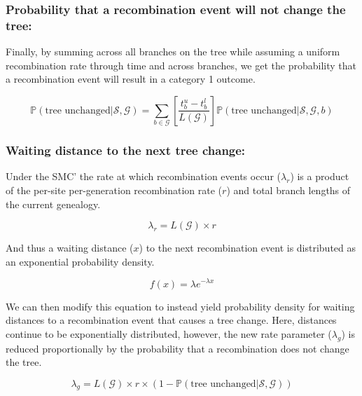 \documentclass[11pt]{article}
\begin{document}
\subsubsection{Probability that a recombination event will not change the tree:}
Finally, by summing across all branches on the tree while assuming a uniform 
recombination rate through time and across branches, we get the
probability that a recombination event will result in a category 1 outcome.

\begin{equation}
	\mathbb{P}(\textrm{tree unchanged} | \mathcal{S},\mathcal{G}) = 
	\sum_{b \in \mathcal{G}}
	\left[\frac{t^u_b - t^l_b}{L(\mathcal{G})}\right]
	\mathbb{P}(\textrm{tree unchanged} | \mathcal{S},\mathcal{G},b)
\end{equation}

\subsubsection{Waiting distance to the next tree change:}
Under the SMC' the rate at which recombination events occur ($\lambda_r$)
is a product of the per-site per-generation recombination rate ($r$) and 
total branch lengths of the current genealogy.

\begin{equation}
	\lambda_{r} = L(\mathcal{G}) \times r
\end{equation}

\noindent And thus a waiting distance ($x$) to the next recombination event 
is distributed as an exponential probability density.

\begin{equation}
	f(x) = \lambda e^{-\lambda x}
\end{equation}

\noindent We can then modify this equation to instead yield probability
density for waiting distances to a recombination event that causes a 
tree change. 
Here, distances continue to be exponentially distributed, however, 
the new rate parameter ($\lambda_g$) is reduced proportionally by 
the probability that a recombination does not change the tree.

\begin{equation}
	\lambda_{g} = 
	L(\mathcal{G}) \times r \times 
	(1 - \mathbb{P}(\text{tree unchanged} | \mathcal{S},\mathcal{G}))
\end{equation}

\end{document}
